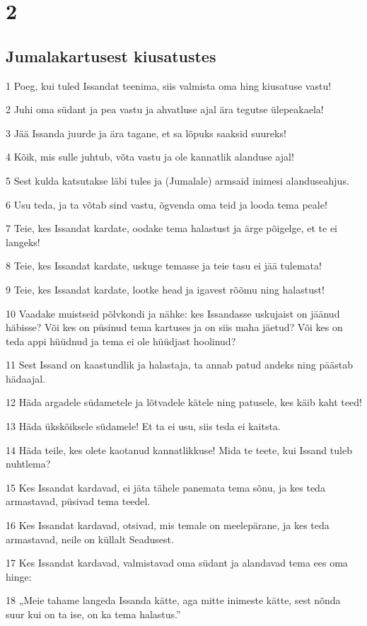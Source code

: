 \chapter{2}

\section*{Jumalakartusest kiusatustes}

\par 1 Poeg, kui tuled Issandat teenima, siis valmista oma hing kiusatuse vastu!
\par 2 Juhi oma südant ja pea vastu ja ahvatluse ajal ära tegutse ülepeakaela!
\par 3 Jää Issanda juurde ja ära tagane, et sa lõpuks saaksid suureks!
\par 4 Kõik, mis sulle juhtub, võta vastu ja ole kannatlik alanduse ajal!
\par 5 Sest kulda katsutakse läbi tules ja (Jumalale) armsaid inimesi alanduseahjus.
\par 6 Usu teda, ja ta võtab sind vastu, õgvenda oma teid ja looda tema peale!
\par 7 Teie, kes Issandat kardate, oodake tema halastust ja ärge põigelge, et te ei langeks!
\par 8 Teie, kes Issandat kardate, uskuge temasse ja teie tasu ei jää tulemata!
\par 9 Teie, kes Issandat kardate, lootke head ja igavest rõõmu ning halastust!
\par 10 Vaadake muistseid põlvkondi ja nähke: kes Issandasse uskujaist on jäänud häbisse? Või kes on püsinud tema kartuses ja on siis maha jäetud? Või kes on teda appi hüüdnud ja tema ei ole hüüdjast hoolinud?
\par 11 Sest Issand on kaastundlik ja halastaja, ta annab patud andeks ning päästab hädaajal.
\par 12 Häda argadele südametele ja lõtvadele kätele ning patusele, kes käib kaht teed!
\par 13 Häda ükskõiksele südamele! Et ta ei usu, siis teda ei kaitsta.
\par 14 Häda teile, kes olete kaotanud kannatlikkuse! Mida te teete, kui Issand tuleb nuhtlema?
\par 15 Kes Issandat kardavad, ei jäta tähele panemata tema sõnu, ja kes teda armastavad, püsivad tema teedel.
\par 16 Kes Issandat kardavad, otsivad, mis temale on meelepärane, ja kes teda armastavad, neile on küllalt Seadusest.
\par 17 Kes Issandat kardavad, valmistavad oma südant ja alandavad tema ees oma hinge:
\par 18 „Meie tahame langeda Issanda kätte, aga mitte inimeste kätte, sest nõnda suur kui on ta ise, on ka tema halastus.”

